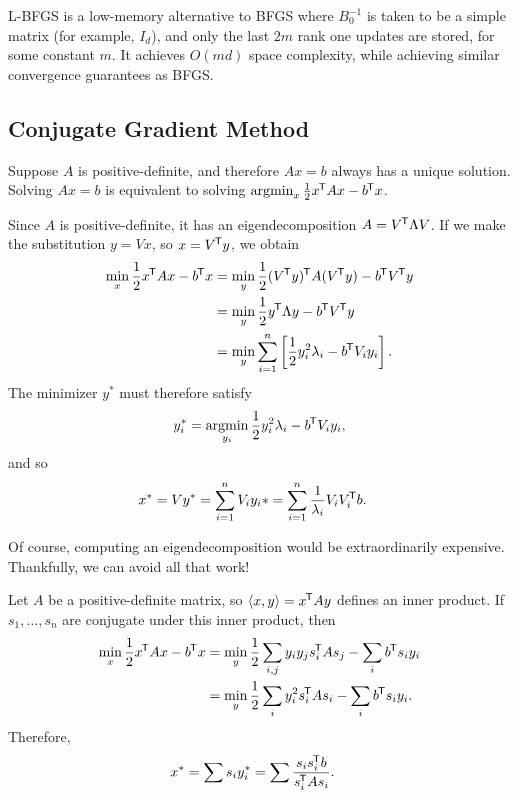 \begin{defn}
    L-BFGS is a low-memory alternative to BFGS where $B_0^{-1}$ is taken to be a simple matrix (for example, $I_d$), and only the last $2m$ rank one updates are stored, for some constant $m$. It achieves $O(md)$ space complexity, while achieving similar convergence guarantees as BFGS.
\end{defn}

\subsection{Conjugate Gradient Method}

Suppose $A$ is positive-definite, and therefore $Ax = b$ always has a unique solution. Solving $Ax = b$ is equivalent to solving $\operatorname*{argmin}_{x}\frac{1}{2}x^{\mkern-1.5mu\mathsf{T}}Ax - b^{\mkern-1.5mu\mathsf{T}}x$.

Since $A$ is positive-definite, it has an eigendecomposition $A = V^{\mkern-1.5mu\mathsf{T}}\Lambda V$. If we make the substitution $y = Vx$, so $x = V^{\mkern-1.5mu\mathsf{T}}y$, we obtain
\begin{align*}
    \min_{x}\frac{1}{2}x^{\mkern-1.5mu\mathsf{T}}Ax - b^{\mkern-1.5mu\mathsf{T}}x &= \min_{y}\frac{1}{2}(V^{\mkern-1.5mu\mathsf{T}}y)^{\mkern-1.5mu\mathsf{T}}A(V^{\mkern-1.5mu\mathsf{T}}y) - b^{\mkern-1.5mu\mathsf{T}}V^{\mkern-1.5mu\mathsf{T}}y \\
    &= \min_{y}\frac{1}{2}y^{\mkern-1.5mu\mathsf{T}}\Lambda y - b^{\mkern-1.5mu\mathsf{T}}V^{\mkern-1.5mu\mathsf{T}}y \\
    &= \min_{y}\sum_{i=1}^{n}\left[\frac{1}{2}y_i^2\lambda_i - b^{\mkern-1.5mu\mathsf{T}}V_iy_i\right].
\end{align*}
The minimizer $y^*$ must therefore satisfy
\begin{align*}
    y_i^* = \operatorname*{argmin}_{y_i}\frac{1}{2}y_i^2\lambda_i - b^{\mkern-1.5mu\mathsf{T}}V_iy_i,
\end{align*}
and so
\begin{align*}
    x^* &= Vy^* = \sum_{i=1}^{n}V_iy_i* = \sum_{i=1}^{n}\frac{1}{\lambda_i}V_iV_i^{\mkern-1.5mu\mathsf{T}}b.
\end{align*}

Of course, computing an eigendecomposition would be extraordinarily expensive. Thankfully, we can avoid all that work!

\begin{lemma}
    Let $A$ be a positive-definite matrix, so $\langle x, y\rangle = x^{\mkern-1.5mu\mathsf{T}}Ay$ defines an inner product. If $s_1, \ldots, s_n$ are conjugate under this inner product, then
    \begin{align*}
        \min_{x}\frac{1}{2}x^{\mkern-1.5mu\mathsf{T}}Ax - b^{\mkern-1.5mu\mathsf{T}}x &= \min_{y}\frac{1}{2}\sum_{i,j}y_iy_js_i^{\mkern-1.5mu\mathsf{T}}As_j - \sum_{i}b^{\mkern-1.5mu\mathsf{T}}s_iy_i \\
        &= \min_{y}\frac{1}{2}\sum_{i}y_i^2s_i^{\mkern-1.5mu\mathsf{T}}As_i - \sum_{i}b^{\mkern-1.5mu\mathsf{T}}s_iy_i.
    \end{align*}
    Therefore,
    \begin{align*}
        x^* &= \sum s_iy_i^* = \sum\frac{s_is_i^{\mkern-1.5mu\mathsf{T}}b}{s_i^{\mkern-1.5mu\mathsf{T}}As_i}.
    \end{align*}
\end{lemma}

